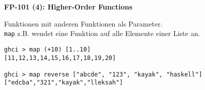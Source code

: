 \documentclass{beamer}
\begin{document}
\begin{frame}[fragile]
    \begin{center}
     \Large\textbf{FP-101 (4): Higher-Order Functions}\\ \bigskip \normalsize    
    \end{center}
    
    Funktionen mit anderen Funktionen als Parameter.\\
    \texttt{map} z.B. wendet eine Funktion auf alle Elemente einer Liste an. 

\begin{verbatim}
ghci > map (+10) [1..10]
[11,12,13,14,15,16,17,18,19,20]

ghci > map reverse ["abcde", "123", "kayak", "haskell"]
["edcba","321","kayak","lleksah"]
\end{verbatim}    
    
\end{frame}
  
\end{document}

